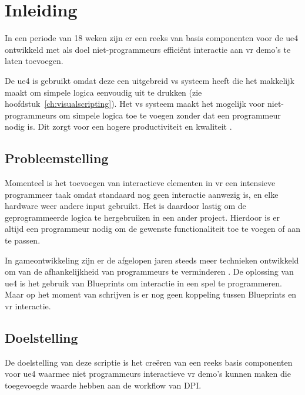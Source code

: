 \chapter{Inleiding}

In een periode van 18 weken zijn er een reeks van basis componenten voor de \gls{ue4} ontwikkeld met als doel niet-programmeurs efficiënt interactie aan \gls{vr} demo’s te laten toevoegen.

De \gls{ue4} is gebruikt omdat deze een uitgebreid \gls{vs} systeem heeft die het makkelijk maakt om simpele logica eenvoudig uit te drukken (zie hoofdstuk~\ref{ch:visualscripting}). Het \gls{vs} systeem maakt het mogelijk voor niet-programmeurs om simpele logica toe te voegen zonder dat een programmeur nodig is. Dit zorgt voor een hogere productiviteit en kwaliteit \cite{Cutumisu200732}.


\section{Probleemstelling}

Momenteel is het toevoegen van interactieve elementen in \gls{vr} een intensieve programmeer taak omdat standaard nog geen interactie aanwezig is, en elke hardware weer andere input gebruikt. Het is daardoor lastig om de geprogrammeerde logica te hergebruiken in een ander project. Hierdoor is er altijd een programmeur nodig om de gewenste functionaliteit toe te voegen of aan te passen. 

In gameontwikkeling zijn er de afgelopen jaren steeds meer technieken ontwikkeld om van de afhankelijkheid van programmeurs te verminderen \cite{Cutumisu200732, ambientbehav}. De oplossing van \gls{ue4} is het gebruik van Blueprints om interactie in een spel te programmeren. Maar op het moment van schrijven is er nog geen koppeling tussen Blueprints en \gls{vr} interactie.


\section{Doelstelling}

De doelstelling van deze scriptie is het creëren van een reeks basis componenten voor \gls{ue4} waarmee niet programmeurs interactieve \gls{vr} demo’s kunnen maken die toegevoegde waarde hebben aan de workflow van DPI.

